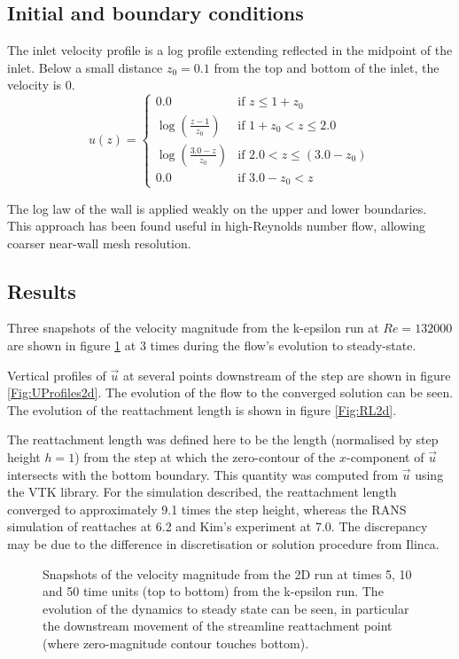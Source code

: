 \subsection{Initial and boundary conditions}
The inlet velocity profile is a log profile extending reflected in the midpoint of the inlet. Below a small distance $z_0=0.1$ from the top and bottom of the inlet, the velocity is 0.
\begin{equation*}
u(z) =
  \begin{cases}
    0.0 & \text{if } z \leq 1+z_0 \\
    \log \left(\frac{z-1}{z_0}\right) & \text{if } 1+z_0 < z \leq 2.0 \\
    \log \left(\frac{3.0-z}{z_0}\right) & \text{if } 2.0 < z \leq (3.0-z_0) \\
    0.0 & \text{if } 3.0-z_0 < z
  \end{cases}
\end{equation*}

The log law of the wall is applied weakly on the upper and lower boundaries.
This approach has been found useful in high-Reynolds number flow, allowing coarser near-wall mesh resolution.

\subsection{Results}
Three snapshots of the velocity magnitude from the k-epsilon run at $Re=132000$
are shown in figure \ref{Fig:velo-magnitude-2d} at 3 times during the flow's evolution to steady-state.

Vertical profiles of $\vec{u}$ at several points downstream of the step are shown
in figure \ref{Fig:UProfiles2d}. The evolution of the flow to the converged solution can be seen.
The evolution of the reattachment length is shown in figure \ref{Fig:RL2d}.

The reattachment length was defined here to be the length (normalised by step height $h=1$)
from the step at which the zero-contour of the $x$-component of $\vec{u}$ intersects with
the bottom boundary. This quantity was computed from $\vec{u}$
using the VTK library. For the simulation described, the reattachment
length converged to approximately 9.1 times the step height,
whereas the RANS simulation of \cite{ilinca_97} reattaches at 6.2 and Kim's experiment at 7.0.
The discrepancy may be due to the difference in discretisation or solution procedure from Ilinca.

\begin{figure}
\centering
{}
\caption{Snapshots of the velocity magnitude from the 2D run at times 5, 10 and 50 time units
(top to bottom) from the k-epsilon run.
The evolution of the dynamics to steady state can be seen, in particular the downstream movement
of the streamline reattachment point (where zero-magnitude contour touches bottom).}
\label{Fig:velo-magnitude-2d}
\end{figure}

